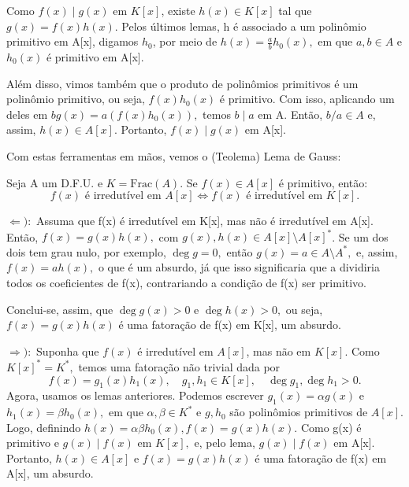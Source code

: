 \documentclass[algebraII_notes.tex]{subfiles}
\begin{document}
\begin{proof*}
	Como \(f(x)\mid g(x)\) em \(K[x]\), existe \(h(x)\in K[x]\) tal que \(g(x) = f(x)h(x).\) Pelos últimos lemas,
	h é associado a um polinômio primitivo em A[x], digamos \(h_{0}\), por meio de \(h(x) = \frac{a}{b}h_{0}(x),\) em que \(a, b\in A\) e
	\(h_{0}(x)\) é primitivo em A[x].

	Além disso, vimos também que o produto de polinômios primitivos é um polinômio primitivo, ou seja, \(f(x)h_{0}(x)\) é primitivo. Com isso,
	aplicando um deles em \(bg(x) = a(f(x)h_{0}(x)),\) temos \(b\mid a\) em A. Então, \(b/a\in A\) e, assim, \(h(x)\in A[x].\)
	Portanto, \(f(x)\mid g(x)\) em A[x]. \qedsymbol
\end{proof*}
Com estas ferramentas em mãos, vemos o (Teolema) Lema de Gauss:
\begin{theorem*}
	Seja A um D.F.U. e \(K = \mathrm{Frac}(A).\) Se \(f(x)\in A[x]\) é primitivo, então:
	\[
		f(x) \text{ é irredutível em }A[x] \Longleftrightarrow f(x) \text{ é irredutível em }K[x].
	\]
\end{theorem*}
\begin{proof*}
	\(\Leftarrow ):\) Assuma que f(x) é irredutível em K[x], mas não é irredutível em A[x]. Então, \(f(x) = g(x)h(x),\) com
	\(g(x), h(x)\in A[x]\setminus{A[x]^{*}}\). Se um dos dois tem grau nulo, por exemplo, \(\deg{g} = 0, \) então
	\(g(x) = a\in A\setminus{A^{*}},\) e, assim, \(f(x) = ah(x),\) o que é um absurdo, já que isso significaria que
	a dividiria todos os coeficientes de f(x), contrariando a condição de f(x) ser primitivo.

	Conclui-se, assim, que \(\deg{g(x)} > 0\) e \(\deg{h(x)} > 0,\) ou seja, \(f(x) = g(x)h(x)\) é uma fatoração de
	f(x) em K[x], um absurdo.

	\(\Rightarrow ):\) Suponha que \(f(x)\) é irredutível em \(A[x]\), mas não em \(K[x]\). Como \(K[x]^{*} = K^{*},\) temos uma
	fatoração não trivial dada por
	\[
		f(x) = g_{1}(x)h_{1}(x),\quad g_{1}, h_{1}\in K[x],\quad \deg{g_{1}}, \deg{h_{1}} > 0.
	\]
	Agora, usamos os lemas anteriores. Podemos escrever \(g_{1}(x) = \alpha g(x)\) e \(h_{1}(x) = \beta h_{0}(x),\) em que \(\alpha , \beta \in K^{*}\)
	e \(g, h_{0}\) são polinômios primitivos de \(A[x].\) Logo, definindo \(h(x) = \alpha \beta h_{0}(x), f(x) = g(x)h(x).\) Como g(x) é primitivo e
	\(g(x)\mid f(x)\) em \(K[x],\) e, pelo lema, \(g(x)\mid f(x)\) em A[x]. Portanto, \(h(x)\in A[x]\) e \(f(x) = g(x)h(x)\) é uma fatoração de f(x) em A[x],
	um absurdo. \qedsymbol
\end{proof*}
\end{document}
